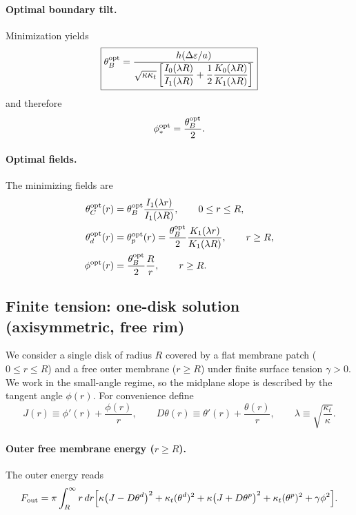 \documentclass[11pt]{article}
\begin{document}
\paragraph{Optimal boundary tilt.}
Minimization yields
\begin{equation}
\boxed{
\theta_B^{\rm opt}
=
\frac{h(\Delta\varepsilon/a)}
{\sqrt{\kappa\kappa_t}
\left[
\dfrac{I_0(\lambda R)}{I_1(\lambda R)}
+\dfrac{1}{2}\dfrac{K_0(\lambda R)}{K_1(\lambda R)}
\right]}
}
\end{equation}
and therefore
\begin{equation}
\phi_*^{\rm opt}=\frac{\theta_B^{\rm opt}}{2}.
\end{equation}

\paragraph{Optimal fields.}
The minimizing fields are
\begin{align}
\theta_C^{\rm opt}(r)
&=\theta_B^{\rm opt}\frac{I_1(\lambda r)}{I_1(\lambda R)},
\qquad 0\le r\le R,\\
\theta_d^{\rm opt}(r)
&=\theta_p^{\rm opt}(r)
=\frac{\theta_B^{\rm opt}}{2}
\frac{K_1(\lambda r)}{K_1(\lambda R)},
\qquad r\ge R,\\
\phi^{\rm opt}(r)
&=\frac{\theta_B^{\rm opt}}{2}\frac{R}{r},
\qquad r\ge R.
\end{align}

\subsection{Finite tension: one-disk solution (axisymmetric, free rim)}

We consider a single disk of radius $R$ covered by a flat membrane patch ($0\le r\le R$) and
a free outer membrane ($r\ge R$) under finite surface tension $\gamma>0$.
We work in the small-angle regime, so the midplane slope is described by the tangent angle $\phi(r)$.
For convenience define
\begin{equation}
J(r)\equiv \phi'(r)+\frac{\phi(r)}{r},\qquad
D\theta(r)\equiv \theta'(r)+\frac{\theta(r)}{r},
\qquad
\lambda \equiv \sqrt{\frac{\kappa_t}{\kappa}}.
\end{equation}

\paragraph{Outer free membrane energy ($r\ge R$).}
The outer energy reads
\begin{equation}
F_{\rm out}
=\pi\int_R^\infty r\,dr
\Big[
\kappa\big(J-D\theta^d\big)^2+\kappa_t(\theta^d)^2
+\kappa\big(J+D\theta^p\big)^2+\kappa_t(\theta^p)^2
+\gamma \phi^2
\Big].
\end{equation}
\end{document}
